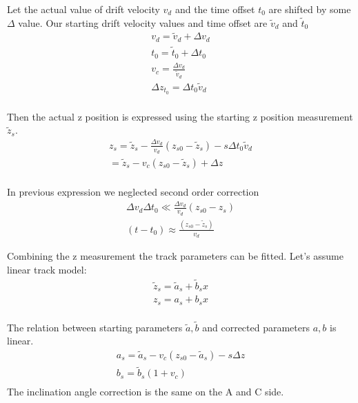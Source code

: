 \documentclass{elsart}
\begin{document}
Let the actual value of drift velocity $v_d$ and the time offset $t_0$ are shifted by some $\Delta$ value.
Our starting drift velocity values and time offset are $\tilde{v}_d$ and $\tilde{t}_0$
\begin{equation}
\begin{split}
v_d=\tilde{v}_d+\Delta v_d \\
t_0=\tilde{t}_0+\Delta t_0 \\
v_c = \frac{\Delta{v_d}}{\tilde{v}_d} \\
\Delta{z}_{t_0} = \Delta{t}_0\tilde{v}_d \\
\end{split}
\end{equation}

Then the actual z position is expressed using the starting z position measurement $\tilde{z}_s$. 
\begin{equation}
\begin{split}
z_s = \tilde{z}_s-\frac{\Delta v_d}{v_d}(z_{s0}-\tilde{z}_{s})-s\Delta t_0 \tilde{v}_d\\= \tilde{z}_{s} -v_c(z_{s0}-\tilde{z}_{s})+\Delta{z}\\
\end{split}
\end{equation}


In previous expression  we neglected second order correction
\begin{equation}
\begin{split}
\Delta{v_d}\Delta{t_0}\ll\frac{\Delta v_d}{v_d}(z_{s0}-z_{s}) \\
(t-t_0)\approx \frac{(z_{s0}-\tilde{z}_{s})}{v_d}
\end{split}
\end{equation}

Combining the z measurement the track parameters can be fitted. Let's assume linear track model:
\begin{equation}
\begin{split}
\tilde{z}_s =\tilde{a}_s+\tilde{b}_sx \\
z_s = a_s+ b_sx \\
\end{split}
\end{equation}

The relation between starting  parameters $\tilde{a}, \tilde{b}$ and corrected parameters $a,b$ is linear.
\begin{equation}
\begin{split}
a_s=\tilde{a}_s-v_c(z_{s0}-\tilde{a}_s)-s\Delta{z}\\
b_s=\tilde{b}_s(1+v_c)\\
\end{split}
\end{equation}
The inclination angle correction is the same on the A and C side.
 
\end{document}
